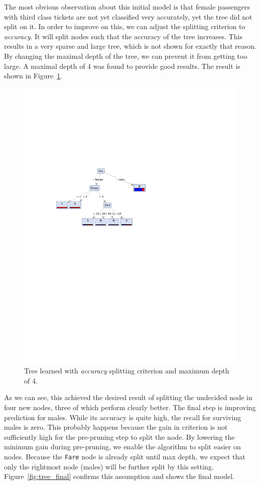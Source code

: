 \documentclass[12pt,a4paper]{article}
\begin{document}
\par The most obvious observation about this initial model is that female passengers with third class tickets are not yet classified very accurately, yet the tree did not split on it. In order to improve on this, we can adjust the splitting criterion to \emph{accuracy}. It will split nodes such that the accuracy of the tree increases. This results in a very sparse and large tree, which is not shown for exactly that reason. By changing the maximal depth of the tree, we can prevent it from getting too large. A maximal depth of 4 was found to provide good results. The result is shown in Figure~\ref{fig:tree_accuracy}.
\begin{figure}[htbp]
  \centering
  \includegraphics[width = .6\textwidth]{tree_accuracy}
  \captionsetup{width=.8\textwidth}
  \caption{Tree learned with \emph{accuracy} splitting criterion and maximum depth of 4.}
  \label{fig:tree_accuracy}
\end{figure}
As we can see, this achieved the desired result of splitting the undecided node in four new nodes, three of which perform clearly better. The final step is improving prediction for males. While its accuracy is quite high, the recall for surviving males is zero. This probably happens because the gain in criterion is not sufficiently high for the pre-pruning step to split the node. By lowering the minimum gain during pre-pruning, we enable the algorithm to split easier on nodes. Because the \texttt{Fare} node is already split until max depth, we expect that only the rightmost node (males) will be further split by this setting. Figure~\ref{fig:tree_final} confirms this assumption and shows the final model. 
\end{document}

